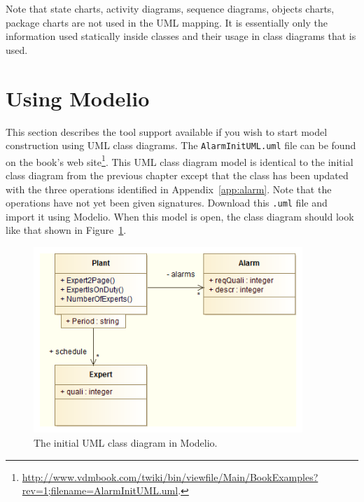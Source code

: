 

Note that state charts, activity
diagrams, sequence diagrams, objects charts, package charts are not
used in the UML mapping. It is essentially only the information used
statically inside classes and their usage in class diagrams that is
used.

\section{Using Modelio}\label{sec:Rose}

This section describes the tool support available if you wish to start
model construction using UML class diagrams.
The \texttt{AlarmInitUML.uml} file can be found on the book's web
site\footnote{\url{http://www.vdmbook.com/twiki/bin/viewfile/Main/BookExamples?rev=1;filename=AlarmInitUML.uml}.}.
This UML class diagram model is identical to the initial class
diagram from the previous chapter
except that the  class has been updated with the three
operations identified in Appendix~\ref{app:alarm}.
Note that the operations have not yet been given signatures. Download
this \texttt{.uml} file and import it using Modelio. When
this model is open, the class diagram should look like that shown in
Figure~\ref{fig:initialumlmodelio}.

\begin{figure}[htbp]
\begin{center}
\includegraphics[width=4in]{figures/initialumlmodelio}
\caption{The initial UML class diagram in Modelio.\label{fig:initialumlmodelio}}
\end{center}
\end{figure}

